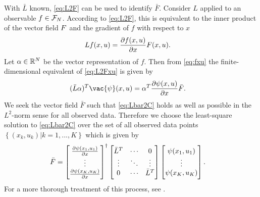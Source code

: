 With $\bar{L}$ known, \eqref{eq:L2F} can be used to identify $\bar{F}$.
Consider $L$ applied to an observable $f \in \mathcal{F}_N$.
According to \eqref{eq:L2F}, this is equivalent to the inner product of the vector field $F$ and the gradient of $f$ with respect to $x$  
\begin{align}
    L f(x,u) &= \frac{\partial f(x,u)}{\partial x} F(x,u).
    \label{eq:L2Fxu}
\end{align}
Let $\alpha \in \mathbb{R}^N$ be the vector representation of $f$.
Then from \eqref{eq:fxu} the finite-dimensional equivalent of \eqref{eq:L2Fxu} is given by
\begin{align}
    (\bar{L} {\alpha})^T \vac{\psi}(\xv,\uv) &= {\alpha}^T \frac{\partial \psi(\xv, \uv)}{\partial \xv} \bar{F}.
    \label{eq:Lbar2C}
\end{align}
We seek the vector field $\bar{F}$ such that \eqref{eq:Lbar2C} holds as well as possible in the $L^2$-norm sense for all observed data.
Therefore we choose the least-square solution to \eqref{eq:Lbar2C} over the set of all observed data points $\left\{ (x_k,u_k) | k = 1,...,K \right\}$ which is given by
\begin{align}
    \bar{F} &= \begin{bmatrix}  \frac{\partial \psi(x_1, u_1)}{\partial x} \\ \vdots \\ \frac{\partial \psi(x_K, u_K)}{\partial x}  \end{bmatrix}^\dagger
    \begin{bmatrix}  \bar{L}^T & \cdots & 0 \\ \vdots & \ddots & \vdots \\ 0 & \cdots & \bar{L}^T  \end{bmatrix}
    \begin{bmatrix}  \psi(x_1,u_1) \\ \vdots \\ \psi(x_K,u_K)  \end{bmatrix}.
\end{align}
For a more thorough treatment of this process, see \cite{mauroy2016linear, mauroy2017koopman}.
